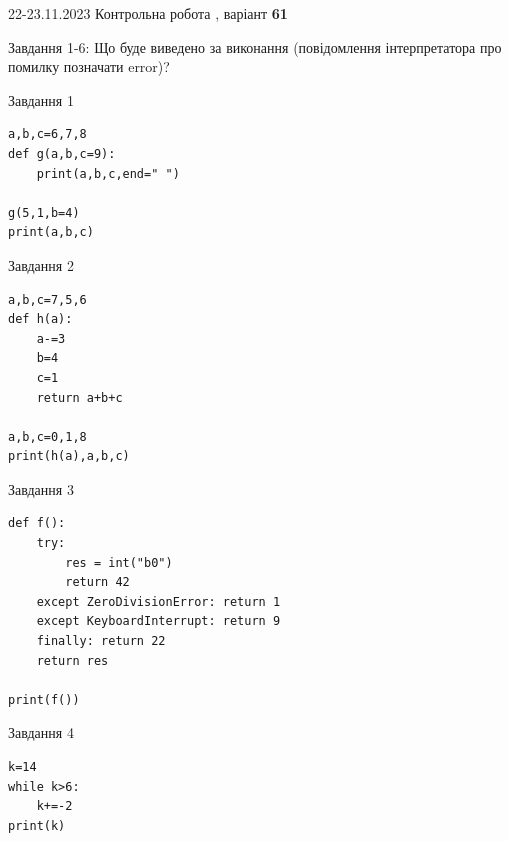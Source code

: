 \documentclass[12pt, ukrainian]{article}
\begin{document}
{{22-23.11.2023 Контрольна робота , варіант  \No \textbf { 61 }\par}}
{

Завдання 1-6: Що буде виведено за виконання (повідомлення інтерпретатора про помилку позначати error)?


\begin{minipage}[t]{9.7cm}                
{\begin{center}Завдання {1}\end{center}}
\begin{verbatim}
a,b,c=6,7,8
def g(a,b,c=9):
    print(a,b,c,end=" ")

g(5,1,b=4)
print(a,b,c)
\end{verbatim}     
\end{minipage}
\vline \hspace{8mm}
\begin{minipage}[t]{8.0cm}                
{\begin{center}Завдання {2}\end{center}}
\begin{verbatim}
a,b,c=7,5,6
def h(a):
    a-=3
    b=4
    c=1
    return a+b+c

a,b,c=0,1,8
print(h(a),a,b,c)
\end{verbatim}     
\end{minipage}

\vspace{15mm}
\begin{minipage}[t]{9.7cm}                
{\begin{center}Завдання {3}\end{center}}
\begin{verbatim}
def f():
    try:
        res = int("b0")
        return 42
    except ZeroDivisionError: return 1
    except KeyboardInterrupt: return 9
    finally: return 22
    return res

print(f())
\end{verbatim}     
\end{minipage}
\vline \hspace{8mm}
\begin{minipage}[t]{8.0cm}                
{\begin{center}Завдання {4}\end{center}}
\begin{verbatim}
k=14
while k>6:
    k+=-2
print(k)
\end{verbatim}     
\end{minipage}

}
\end{document}
